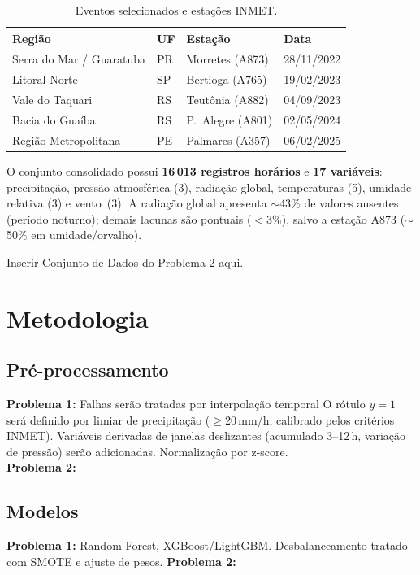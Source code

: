 \documentclass[10pt,twocolumn,letterpaper]{article}
\begin{document}
\begin{table}[h]
\centering
\caption{Eventos selecionados e estações INMET.}
\label{tab:eventos}
\small
\setlength{\tabcolsep}{3pt}
\begin{tabular}{@{}llll@{}}
\toprule
\textbf{Região} & \textbf{UF} & \textbf{Estação} & \textbf{Data} \\
\midrule
Serra do Mar / Guaratuba  & PR & Morretes (A873)   & 28/11/2022 \\
Litoral Norte             & SP & Bertioga (A765)   & 19/02/2023 \\
Vale do Taquari           & RS & Teutônia (A882)   & 04/09/2023 \\
Bacia do Guaíba           & RS & P.\ Alegre (A801) & 02/05/2024 \\
Região Metropolitana      & PE & Palmares (A357)   & 06/02/2025 \\
\bottomrule
\end{tabular}
\end{table}

O conjunto consolidado possui \textbf{16\,013 registros horários} e
\textbf{17 variáveis}: precipitação, pressão atmosférica (3),
radiação global, temperaturas (5), umidade relativa (3) e vento~(3).
A radiação global apresenta $\sim$43\% de valores ausentes (período
noturno); demais lacunas são pontuais ($<$3\%), salvo a estação A873
($\sim$50\% em umidade/orvalho).

Inserir Conjunto de Dados do Problema 2 aqui.

\section{Metodologia}

\subsection{Pré-processamento}
\textbf{Problema 1:} Falhas serão tratadas por interpolação temporal
O rótulo $y\!=\!1$ será definido por limiar de precipitação
($\geq$20\,mm/h, calibrado pelos critérios INMET). Variáveis
derivadas de janelas deslizantes (acumulado 3--12\,h, variação de
pressão) serão adicionadas. Normalização por z-score. \\
\textbf{Problema 2:}

\subsection{Modelos}
\textbf{Problema 1:}
Random Forest, XGBoost/LightGBM.
Desbalanceamento tratado com SMOTE e ajuste de
pesos.
\textbf{Problema 2:}
\end{document}
